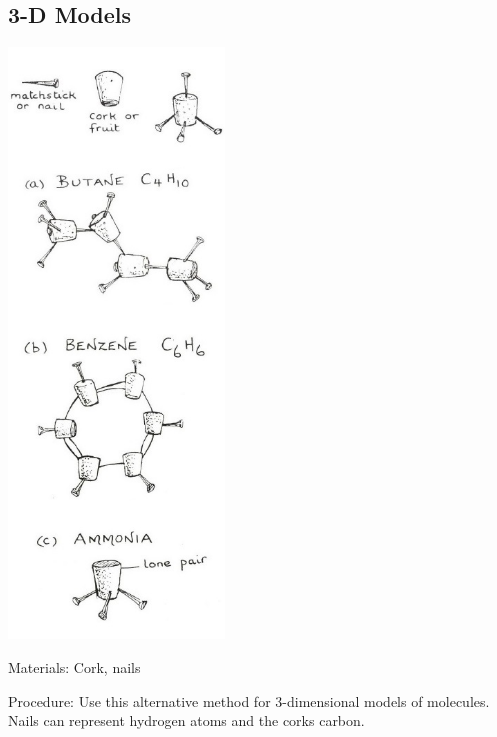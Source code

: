 \begin{multicols}{2}
\vfill
\columnbreak

\subsection{3-D Models}

\begin{center} %
\includegraphics[width=0.43\textwidth]{./img/source/3d-models-2.jpg}
\end{center}

\begin{description*}
\item[Materials:]{Cork, nails}
\item[Procedure:]{Use this alternative method for 3-dimensional models of molecules. Nails can represent hydrogen atoms and the corks carbon.}
\end{description*}


\end{multicols}
